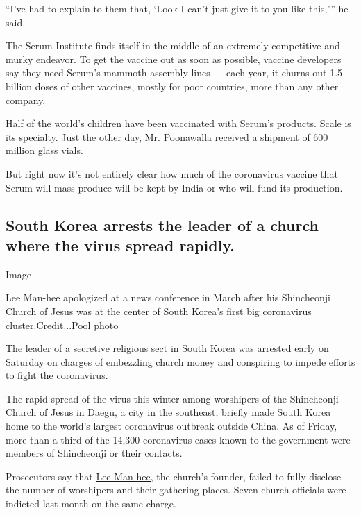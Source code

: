 ``I've had to explain to them that, `Look I can't just give it to you
like this,''' he said.

The Serum Institute finds itself in the middle of an extremely
competitive and murky endeavor. To get the vaccine out as soon as
possible, vaccine developers say they need Serum's mammoth assembly
lines --- each year, it churns out 1.5 billion doses of other vaccines,
mostly for poor countries, more than any other company.

Half of the world's children have been vaccinated with Serum's products.
Scale is its specialty. Just the other day, Mr. Poonawalla received a
shipment of 600 million glass vials.

But right now it's not entirely clear how much of the coronavirus
vaccine that Serum will mass-produce will be kept by India or who will
fund its production.

\hypertarget{south-korea-arrests-the-leader-of-a-church-where-the-virus-spread-rapidly}{%
\subsection{South Korea arrests the leader of a church where the virus
spread
rapidly.}\label{south-korea-arrests-the-leader-of-a-church-where-the-virus-spread-rapidly}}

Image

Lee Man-hee apologized at a news conference in March after his
Shincheonji Church of Jesus was at the center of South Korea's first big
coronavirus cluster.Credit...Pool photo

The leader of a secretive religious sect in South Korea was arrested
early on Saturday on charges of embezzling church money and conspiring
to impede efforts to fight the coronavirus.

The rapid spread of the virus this winter among worshipers of the
Shincheonji Church of Jesus in Daegu, a city in the southeast, briefly
made South Korea home to the world's largest coronavirus outbreak
outside China. As of Friday, more than a third of the 14,300 coronavirus
cases known to the government were members of Shincheonji or their
contacts.

Prosecutors say that
\href{https://www.nytimes.com/2020/03/02/world/asia/coronavirus-south-korea-shincheonji.html?searchResultPosition=1}{Lee
Man-hee,} the church's founder, failed to fully disclose the number of
worshipers and their gathering places. Seven church officials were
indicted last month on the same charge.

